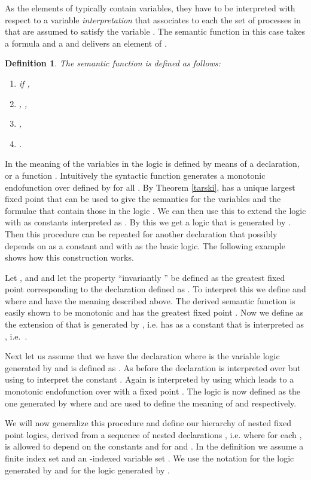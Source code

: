 \documentclass[submission]{eptcs}
\newtheorem{definition}[theorem]{Definition}
\newenvironment{example}[1][Example]{\begin{trivlist}
\item[\hskip \labelsep {\bfseries #1}]}{\end{trivlist}}
\begin{document}
As the elements of  typically contain variables, they have to
be interpreted with respect to a variable \emph{interpretation}
 that associates to each  the set of
processes in  that are assumed to satisfy the variable .
The semantic function  in this case takes a formula
 and a  and delivers an element of
.
\begin{definition}\label{def:V}
The semantic function  is defined as follows:
\begin{enumerate}
\item  if ,
\item 
  , ,
\item ,
\item
  . 
\end{enumerate}
\end{definition}
In \cite{Larsen1990} the meaning of the variables in the logic  is
defined by means of a declaration, or a function
. Intuitively the syntactic function generates a monotonic
endofunction  over  defined by
 for all . By Theorem
\ref{tarski},  has a unique largest fixed point
 that can be used to give the semantics
for the variables and the formulae that contain those in the logic
.  We can then use this to extend the logic  with  as constants  interpreted as
. By this we get a logic  that is
generated by . Then this procedure can be repeated for another
declaration that possibly depends on  as a constant and with
 as the basic logic. The following example shows how this
construction works.
\begin{example}
  Let ,  and  and let the property
  ``invariantly '' be defined as the greatest fixed point
  corresponding to the declaration  defined as
  .  To interpret
  this we define  and  where  and  have the
  meaning described above.  The derived semantic function
   is easily
  shown to be monotonic and has the greatest fixed point
  . Now we define  as the
  extension of  that is generated by , i.e. has  as a constant that is
  interpreted as , i.e.~.

  Next let us assume that we have the declaration
   where  is the variable logic generated
  by  and  is
  defined as  . As before
  the declaration is interpreted over  but using
   to interpret the constant . Again
   is interpreted by using  which leads to a
  monotonic endofunction  over 
  with a fixed point . The logic  is now
  defined as the one generated by  where  and
   are used to define the meaning of 
  and  respectively.
\end{example}
We will now generalize this procedure and define our hierarchy of
nested fixed point logics, derived from a sequence of nested
declarations , i.e. where for each ,
 is allowed to depend on the constants  and  for  and . In the definition we assume a
finite index set  and an -indexed variable set .  We use the
notation  for the logic generated by
 and  for the logic
generated by .
\end{document}
